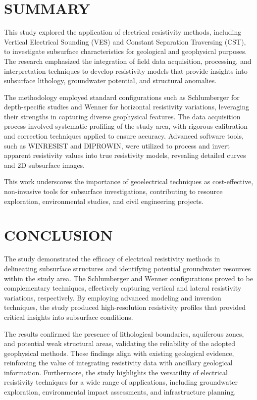 \documentclass[12pt,a4paper]{report}
\begin{document}
\section{SUMMARY}

This study explored the application of electrical resistivity methods, including Vertical Electrical Sounding (VES) and Constant Separation Traversing (CST), to investigate subsurface characteristics for geological and geophysical purposes. The research emphasized the integration of field data acquisition, processing, and interpretation techniques to develop resistivity models that provide insights into subsurface lithology, groundwater potential, and structural anomalies.

The methodology employed standard configurations such as Schlumberger for depth-specific studies and Wenner for horizontal resistivity variations, leveraging their strengths in capturing diverse geophysical features. The data acquisition process involved systematic profiling of the study area, with rigorous calibration and correction techniques applied to ensure accuracy. Advanced software tools, such as WINRESIST and DIPROWIN, were utilized to process and invert apparent resistivity values into true resistivity models, revealing detailed curves and 2D subsurface images.

This work underscores the importance of geoelectrical techniques as cost-effective, non-invasive tools for subsurface investigations, contributing to resource exploration, environmental studies, and civil engineering projects.

\section{CONCLUSION}

The study demonstrated the efficacy of electrical resistivity methods in delineating subsurface structures and identifying potential groundwater resources within the study area. The Schlumberger and Wenner configurations proved to be complementary techniques, effectively capturing vertical and lateral resistivity variations, respectively. By employing advanced modeling and inversion techniques, the study produced high-resolution resistivity profiles that provided critical insights into subsurface conditions.

The results confirmed the presence of lithological boundaries, aquiferous zones, and potential weak structural areas, validating the reliability of the adopted geophysical methods. These findings align with existing geological evidence, reinforcing the value of integrating resistivity data with ancillary geological information. Furthermore, the study highlights the versatility of electrical resistivity techniques for a wide range of applications, including groundwater exploration, environmental impact assessments, and infrastructure planning.
\end{document}
